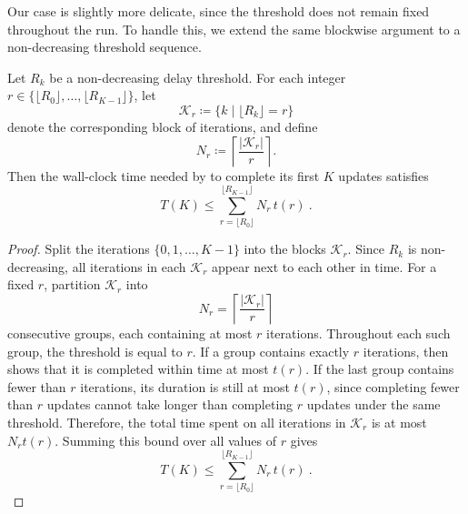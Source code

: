 \documentclass{article}
\begin{document}
Our case is slightly more delicate, since the threshold does not remain fixed throughout the run.
To handle this, we extend the same blockwise argument to a non-decreasing threshold sequence.
% 
\begin{lemma}\label{lem:time_RK}
    Let $R_k$ be a non-decreasing delay threshold.
    For each integer $r \in \{\lfloor R_0 \rfloor, \dots, \lfloor R_{K-1} \rfloor\}$, let
    \begin{equation*}
        \mathcal{K}_r \coloneqq \{k \mid \lfloor R_k \rfloor = r\}
    \end{equation*}
    denote the corresponding block of iterations, and define
    \begin{equation*}
        N_r \coloneqq \left\lceil \frac{|\mathcal{K}_r|}{r} \right\rceil .
    \end{equation*}
    Then the wall-clock time needed by  to complete its first $K$ updates satisfies
    \begin{equation*}
        T(K) \le \sum_{r=\lfloor R_0 \rfloor}^{\lfloor R_{K-1} \rfloor} N_r\, t(r) ~.
    \end{equation*}
\end{lemma}
% 
\begin{proof}
    Split the iterations $\{0,1,\dots,K-1\}$ into the blocks $\mathcal{K}_r$.
    Since $R_k$ is non-decreasing, all iterations in each $\mathcal{K}_r$ appear next to each other in time.
    For a fixed $r$, partition $\mathcal{K}_r$ into
    \begin{equation*}
        N_r = \left\lceil \frac{|\mathcal{K}_r|}{r} \right\rceil
    \end{equation*}
    consecutive groups, each containing at most $r$ iterations.
    Throughout each such group, the threshold is equal to $r$.
    If a group contains exactly $r$ iterations, then  shows that it is completed within time at most $t(r)$.
    If the last group contains fewer than $r$ iterations, its duration is still at most $t(r)$, since completing fewer than $r$ updates cannot take longer than completing $r$ updates under the same threshold.
    Therefore, the total time spent on all iterations in $\mathcal{K}_r$ is at most $N_r t(r)$.
    Summing this bound over all values of $r$ gives
    \begin{equation*}
        T(K) \le \sum_{r=\lfloor R_0 \rfloor}^{\lfloor R_{K-1} \rfloor} N_r\, t(r) ~.
    \end{equation*}
\end{proof}
\end{document}
